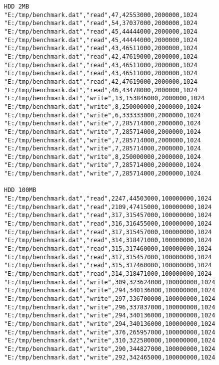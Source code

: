 \documentclass{article}
\begin{document}
\begin{lstlisting}
HDD 2MB
"E:/tmp/benchmark.dat","read",47,42553000,2000000,1024
"E:/tmp/benchmark.dat","read",54,37037000,2000000,1024
"E:/tmp/benchmark.dat","read",45,44444000,2000000,1024
"E:/tmp/benchmark.dat","read",45,44444000,2000000,1024
"E:/tmp/benchmark.dat","read",43,46511000,2000000,1024
"E:/tmp/benchmark.dat","read",42,47619000,2000000,1024
"E:/tmp/benchmark.dat","read",43,46511000,2000000,1024
"E:/tmp/benchmark.dat","read",43,46511000,2000000,1024
"E:/tmp/benchmark.dat","read",42,47619000,2000000,1024
"E:/tmp/benchmark.dat","read",46,43478000,2000000,1024
"E:/tmp/benchmark.dat","write",13,153846000,2000000,1024
"E:/tmp/benchmark.dat","write",8,250000000,2000000,1024
"E:/tmp/benchmark.dat","write",6,333333000,2000000,1024
"E:/tmp/benchmark.dat","write",7,285714000,2000000,1024
"E:/tmp/benchmark.dat","write",7,285714000,2000000,1024
"E:/tmp/benchmark.dat","write",7,285714000,2000000,1024
"E:/tmp/benchmark.dat","write",7,285714000,2000000,1024
"E:/tmp/benchmark.dat","write",8,250000000,2000000,1024
"E:/tmp/benchmark.dat","write",7,285714000,2000000,1024
"E:/tmp/benchmark.dat","write",7,285714000,2000000,1024

HDD 100MB
"E:/tmp/benchmark.dat","read",2247,44503000,100000000,1024
"E:/tmp/benchmark.dat","read",2109,47415000,100000000,1024
"E:/tmp/benchmark.dat","read",317,315457000,100000000,1024
"E:/tmp/benchmark.dat","read",316,316455000,100000000,1024
"E:/tmp/benchmark.dat","read",317,315457000,100000000,1024
"E:/tmp/benchmark.dat","read",314,318471000,100000000,1024
"E:/tmp/benchmark.dat","read",315,317460000,100000000,1024
"E:/tmp/benchmark.dat","read",317,315457000,100000000,1024
"E:/tmp/benchmark.dat","read",315,317460000,100000000,1024
"E:/tmp/benchmark.dat","read",314,318471000,100000000,1024
"E:/tmp/benchmark.dat","write",309,323624000,100000000,1024
"E:/tmp/benchmark.dat","write",294,340136000,100000000,1024
"E:/tmp/benchmark.dat","write",297,336700000,100000000,1024
"E:/tmp/benchmark.dat","write",296,337837000,100000000,1024
"E:/tmp/benchmark.dat","write",294,340136000,100000000,1024
"E:/tmp/benchmark.dat","write",294,340136000,100000000,1024
"E:/tmp/benchmark.dat","write",376,265957000,100000000,1024
"E:/tmp/benchmark.dat","write",310,322580000,100000000,1024
"E:/tmp/benchmark.dat","write",290,344827000,100000000,1024
"E:/tmp/benchmark.dat","write",292,342465000,100000000,1024


\end{lstlisting}

\end{document}
